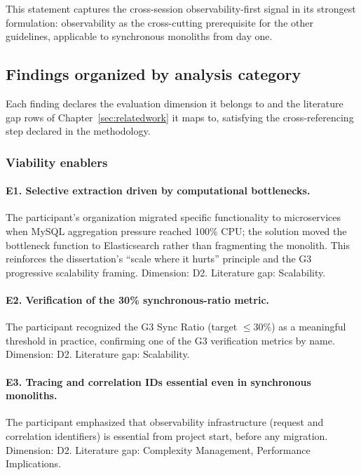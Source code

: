This statement captures the cross-session observability-first signal in its strongest formulation: observability as the cross-cutting prerequisite for the other guidelines, applicable to synchronous monoliths from day one.

\subsection*{Findings organized by analysis category}

Each finding declares the evaluation dimension it belongs to and the literature gap rows of Chapter~\ref{sec:relatedwork} it maps to, satisfying the cross-referencing step declared in the methodology.

\subsubsection*{Viability enablers}

\paragraph*{E1. Selective extraction driven by computational bottlenecks.} The participant's organization migrated specific functionality to microservices when MySQL aggregation pressure reached 100\% CPU; the solution moved the bottleneck function to Elasticsearch rather than fragmenting the monolith. This reinforces the dissertation's ``scale where it hurts'' principle and the G3 progressive scalability framing. Dimension: D2. Literature gap: Scalability.

\paragraph*{E2. Verification of the 30\% synchronous-ratio metric.} The participant recognized the G3 Sync Ratio (target $\leq 30\%$) as a meaningful threshold in practice, confirming one of the G3 verification metrics by name. Dimension: D2. Literature gap: Scalability.

\paragraph*{E3. Tracing and correlation IDs essential even in synchronous monoliths.} The participant emphasized that observability infrastructure (request and correlation identifiers) is essential from project start, before any migration. Dimension: D2. Literature gap: Complexity Management, Performance Implications.

